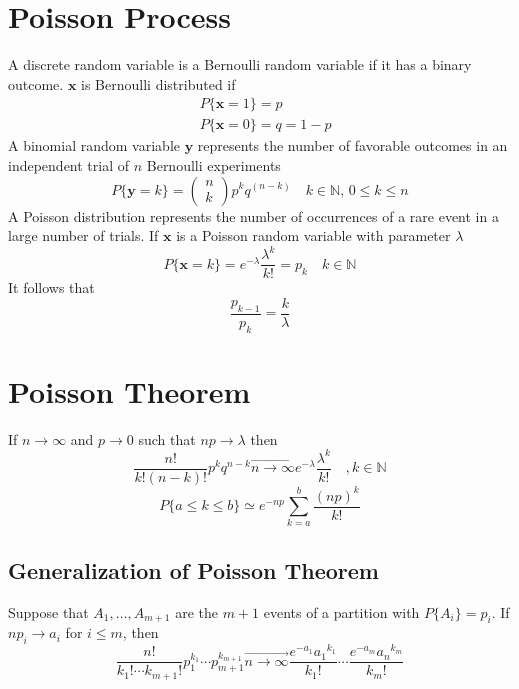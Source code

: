 \documentclass{article}
\begin{document}
	\section{Poisson Process}
		A discrete random variable is a Bernoulli random variable if it has a binary outcome. $\mathbf{x}$ is Bernoulli distributed if
		\begin{align}
			&P\{\mathbf{x}=1\}=p\\
			&P\{\mathbf{x}=0\}=q=1-p
		\end{align}
		A binomial random variable $\mathbf{y}$ represents the number of favorable outcomes in an independent trial of $n$ Bernoulli experiments
		\begin{equation}
			P\{\mathbf{y}=k\}=
			\begin{pmatrix}
				n\\
				k
			\end{pmatrix}
			p^kq^{(n-k)}\quad k\in\mathbb{N},\,0\leq k\leq n
		\end{equation}
		A Poisson distribution represents the number of occurrences of a rare event in a large number of trials. If $\mathbf{x}$ is a Poisson random variable with parameter $\lambda$
		\begin{equation}
			P\{\mathbf{x}=k\}=e^{-\lambda}\frac{\lambda^k}{k!}=p_k\quad k\in\mathbb{N}
		\end{equation}
		It follows that
		\begin{equation}
			\frac{p_{k-1}}{p_k}=\frac{k}{\lambda}
		\end{equation}
	\section{Poisson Theorem}
		If $n\rightarrow\infty$ and $p\rightarrow 0$ such that $np\rightarrow\lambda$ then
		\begin{equation}
			\frac{n!}{k!(n-k)!}p^kq^{n-k}\overrightarrow{n\rightarrow\infty}e^{-\lambda}\frac{\lambda^k}{k!}\quad,k\in\mathbb{N}
		\end{equation}
		\begin{equation}
			P\{a\leq k\leq b\}\simeq e^{-np}\sum_{k=a}^b{\frac{(np)^k}{k!}}
		\end{equation}
		\subsection{Generalization of Poisson Theorem}
			Suppose that $A_1,\ldots,A_{m+1}$ are the $m+1$ events of a partition with $P\{A_i\}=p_i$. If $np_i\rightarrow a_i$ for $i\leq m$, then
			\begin{equation}
				\frac{n!}{k_1!\cdots k_{m+1}!}p_1^{k_1}\cdots p_{m+1}^{k_{m+1}}\overrightarrow{n\rightarrow\infty}\frac{e^{-a_1}{a_1}^{k_1}}{k_1!}\cdots\frac{e^{-a_m}{a_n}^{k_m}}{k_m!}
			\end{equation}
\end{document}
